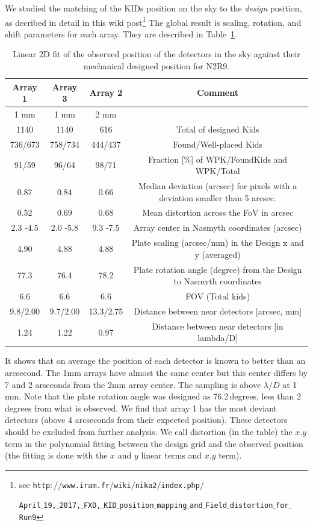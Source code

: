 We studied the matching of the KIDs position on the sky to the
\emph{design} position, as decribed in detail in this wiki post\footnote{see
  {\tt http$://$www.iram.fr$/$wiki$/$nika2$/$index.php$/$}
  
  {\tt April$\_$19,$\_$2017,$\_$FXD,$\_$KID$\_$position$\_$mapping$\_$and$\_$Field$\_$distortion$\_$for$\_$Run9}
}
The global result is scaling, rotation, and shift parameters for each
array. They are described in Table~\ref{ta:gridmatch}.

\begin{table}[ht]
\label{ta:gridmatch}
\begin{center}
\begin{tabular}{|c|c|c|c|}
\hline
Array 1  &	Array 3   &	Array 2   &	Comment \\
\hline
1 mm      &       1 mm     &        2 mm  & \\
1140 	 &      1140 	   &        616  &	Total of designed Kids \\
736/673  &	758/734  &	444/437  &	Found/Well-placed Kids \\
91/59 	 &    96/64 	 &      98/71 	 & Fraction [\%] of WPK/FoundKids and WPK/Total \\
0.87 	 &     0.84 	  & 0.66     &	Median deviation (arcsec) for pixels with a deviation smaller than 5 arcsec. \\
0.52 	 &     0.69 	 &        0.68 	 & Mean distortion across the FoV in arcsec \\
2.3 -4.5  &	2.0 -5.8  &	9.3 -7.5  &	Array center in Nasmyth coordinates (arcsec) \\
4.90  &	4.88  &	4.88  &	Plate scaling (arcsec/mm) in the Design x and y (averaged) \\
77.3  &	76.4  &	78.2  &	Plate rotation angle (degree) from the Design to Nasmyth coordinates \\
6.6  &	6.6  &	6.6  &	FOV (Total kids) \\
9.8/2.00  &	9.7/2.00  &	13.3/2.75  &	Distance between near detectors [arcsec, mm] \\
1.24  &	1.22  &	0.97  &	Distance between near detectors [in lambda/D] \\
\end{tabular}
\end{center}
\caption{Linear 2D fit of the observed position of the detectors in the sky
  against their mechanical designed position for N2R9. }
\end{table}

It shows that on average the position of each detector is known to better than
an arcsecond. The 1mm arrays have almost the same center but this center
differs by 7 and 2 arseconds from the 2mm array center. The sampling is above
$\lambda/D$ at 1 mm. Note that the plate rotation angle was designed as
76.2\,degrees, less than 2 degrees from what is observed. We find that array 1
has the most deviant detectors (above 4 arcseconds from their expected
position). These detectors should be excluded from further analysis. We call
distortion (in the table) the $x.y$ term in the polynomial fitting between the
design grid and the observed position (the fitting is done with the $x$ and
$y$ linear terms and $x.y$ term). 



